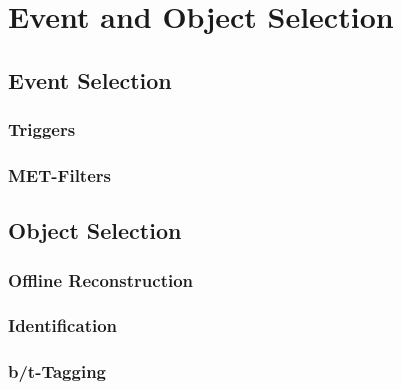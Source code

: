
\chapter{Event and Object Selection}

\section{Event Selection}
\subsection{Triggers}
\subsection{MET-Filters}


\section{Object Selection}
\subsection{Offline Reconstruction}
\subsection{Identification}
\subsection{b/t-Tagging}
